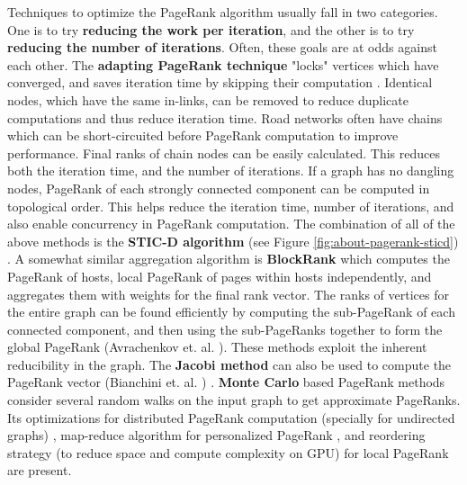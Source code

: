 Techniques to optimize the PageRank algorithm usually fall in two categories. One is to try \textbf{reducing the work per iteration}, and the other is to try \textbf{reducing the number of iterations}. Often, these goals are at odds against each other. The \textbf{adapting PageRank technique} "locks" vertices which have converged, and saves iteration time by skipping their computation \cite{pr-deeper01}. Identical nodes, which have the same in-links, can be removed to reduce duplicate computations and thus reduce iteration time. Road networks often have chains which can be short-circuited before PageRank computation to improve performance. Final ranks of chain nodes can be easily calculated. This reduces both the iteration time, and the number of iterations. If a graph has no dangling nodes, PageRank of each strongly connected component can be computed in topological order. This helps reduce the iteration time, number of iterations, and also enable concurrency in PageRank computation. The combination of all of the above methods is the \textbf{STIC-D algorithm} (see Figure \ref{fig:about-pagerank-sticd}) \cite{pr-sticd16}. A somewhat similar aggregation algorithm is \textbf{BlockRank} which computes the PageRank of hosts, local PageRank of pages within hosts independently, and aggregates them with weights for the final rank vector. The ranks of vertices for the entire graph can be found efficiently by computing the sub-PageRank of each connected component, and then using the sub-PageRanks together to form the global PageRank (Avrachenkov et. al. \cite{pr-avrachenkov04}). These methods exploit the inherent reducibility in the graph. The \textbf{Jacobi method} can also be used to compute the PageRank vector (Bianchini et. al. \cite{pr-bianchini05}) \cite{pr-deeper01}. \textbf{Monte Carlo} based PageRank methods consider several random walks on the input graph to get approximate PageRanks. Its optimizations for distributed PageRank computation (specially for undirected graphs) \cite{compute-frey13}, map-reduce algorithm for personalized PageRank \cite{pr-bahmani11}, and reordering strategy (to reduce space and compute complexity on GPU) for local PageRank \cite{pr-lai17} are present.




